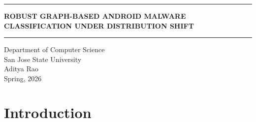 \documentclass[12pt]{article}
\begin{document}
\begin{center}
\vspace*{0.2cm}
\hrule
\vspace{0.45cm}

{\Large \textbf{ROBUST GRAPH-BASED ANDROID MALWARE CLASSIFICATION UNDER DISTRIBUTION SHIFT}}\\

\vspace{0.35cm}
\hrule
\vspace{0.6cm}

{\normalsize
Department of Computer Science\\
San Jose State University\\
\vspace{0.35cm}
Aditya Rao\\
Spring, 2026\\
}

\end{center}

\vfill

\newpage

\tableofcontents
\newpage


\section{Introduction}
\end{document}
